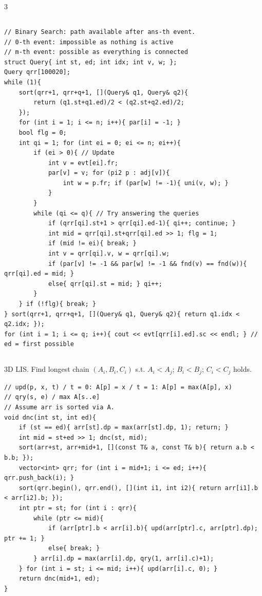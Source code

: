 \documentclass[landscape, 8pt, a4paper, oneside]{extarticle}
\begin{document}
\begin{multicols*}{3}
\subsection{}
\begin{verbatim}
// Binary Search: path available after ans-th event.
// 0-th event: impossible as nothing is active
// m-th event: possible as everything is connected
struct Query{ int st, ed; int idx; int v, w; };
Query qrr[100020];
while (1){
	sort(qrr+1, qrr+q+1, [](Query& q1, Query& q2){
		return (q1.st+q1.ed)/2 < (q2.st+q2.ed)/2;
	});
	for (int i = 1; i <= n; i++){ par[i] = -1; }
	bool flg = 0;
	int qi = 1; for (int ei = 0; ei <= n; ei++){
		if (ei > 0){ // Update
			int v = evt[ei].fr;
			par[v] = v; for (pi2 p : adj[v]){
				int w = p.fr; if (par[w] != -1){ uni(v, w); }
			}
		}
		while (qi <= q){ // Try answering the queries
			if (qrr[qi].st+1 > qrr[qi].ed-1){ qi++; continue; }
			int mid = qrr[qi].st+qrr[qi].ed >> 1; flg = 1;
			if (mid != ei){ break; }
			int v = qrr[qi].v, w = qrr[qi].w;
			if (par[v] != -1 && par[w] != -1 && fnd(v) == fnd(w)){ qrr[qi].ed = mid; }
			else{ qrr[qi].st = mid; } qi++;
		}
	} if (!flg){ break; }
} sort(qrr+1, qrr+q+1, [](Query& q1, Query& q2){ return q1.idx < q2.idx; });
for (int i = 1; i <= q; i++){ cout << evt[qrr[i].ed].sc << endl; } // ed = first possible
\end{verbatim}
\subsection{}
3D LIS. Find longest chain $(A_i, B_i, C_i)$ s.t. $A_i < A_j$; $B_i < B_j$; $C_i < C_j$ holds.
\begin{verbatim}
// upd(p, x, t) / t = 0: A[p] = x / t = 1: A[p] = max(A[p], x)
// qry(s, e) / max A[s..e]
// Assume arr is sorted via A.
void dnc(int st, int ed){
	if (st == ed){ arr[st].dp = max(arr[st].dp, 1); return; }
	int mid = st+ed >> 1; dnc(st, mid);
	sort(arr+st, arr+mid+1, [](const T& a, const T& b){ return a.b < b.b; });
	vector<int> qrr; for (int i = mid+1; i <= ed; i++){ qrr.push_back(i); }
	sort(qrr.begin(), qrr.end(), [](int i1, int i2){ return arr[i1].b < arr[i2].b; });
	int ptr = st; for (int i : qrr){
		while (ptr <= mid){
			if (arr[ptr].b < arr[i].b){ upd(arr[ptr].c, arr[ptr].dp); ptr += 1; }
			else{ break; }
		} arr[i].dp = max(arr[i].dp, qry(1, arr[i].c)+1);
	} for (int i = st; i <= mid; i++){ upd(arr[i].c, 0); }
	return dnc(mid+1, ed);
}
\end{verbatim}

\end{multicols*}
\end{document}

